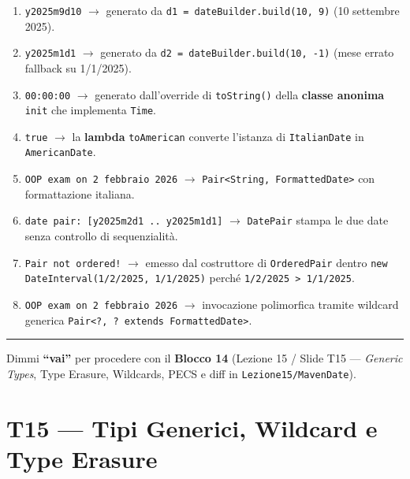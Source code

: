 \documentclass[11pt,a4paper,oneside]{report}
\newcommand{\passthrough}[1]{#1}
\providecommand{\tightlist}{\setlength{\itemsep}{0pt}\setlength{\parskip}{0pt}}
\begin{document}
\begin{enumerate}
\def\labelenumi{\arabic{enumi}.}
\tightlist
\item
  \passthrough{\lstinline!y2025m9d10!} \(\rightarrow\) generato da
  \passthrough{\lstinline!d1 = dateBuilder.build(10, 9)!} (10 settembre
  2025).
\item
  \passthrough{\lstinline!y2025m1d1!} \(\rightarrow\) generato da
  \passthrough{\lstinline!d2 = dateBuilder.build(10, -1)!} (mese errato
  fallback su 1/1/2025).
\item
  \passthrough{\lstinline!00:00:00!} \(\rightarrow\) generato
  dall'override di \passthrough{\lstinline!toString()!} della
  \textbf{classe anonima} \passthrough{\lstinline!init!} che implementa
  \passthrough{\lstinline!Time!}.
\item
  \passthrough{\lstinline!true!} \(\rightarrow\) la \textbf{lambda}
  \passthrough{\lstinline!toAmerican!} converte l'istanza di
  \passthrough{\lstinline!ItalianDate!} in
  \passthrough{\lstinline!AmericanDate!}.
\item
  \passthrough{\lstinline!OOP exam on 2 febbraio 2026!} \(\rightarrow\)
  \passthrough{\lstinline!Pair<String, FormattedDate>!} con
  formattazione italiana.
\item
  \passthrough{\lstinline!date pair: [y2025m2d1 .. y2025m1d1]!}
  \(\rightarrow\) \passthrough{\lstinline!DatePair!} stampa le due date
  senza controllo di sequenzialità.
\item
  \passthrough{\lstinline"Pair not ordered!"} \(\rightarrow\) emesso dal
  costruttore di \passthrough{\lstinline!OrderedPair!} dentro
  \passthrough{\lstinline!new DateInterval(1/2/2025, 1/1/2025)!} perché
  \passthrough{\lstinline!1/2/2025 > 1/1/2025!}.
\item
  \passthrough{\lstinline!OOP exam on 2 febbraio 2026!} \(\rightarrow\)
  invocazione polimorfica tramite wildcard generica
  \passthrough{\lstinline!Pair<?, ? extends FormattedDate>!}.
\end{enumerate}

\begin{center}\rule{0.5\linewidth}{0.5pt}\end{center}

Dimmi \textbf{``vai''} per procedere con il \textbf{Blocco 14} (Lezione
15 / Slide T15 --- \emph{Generic Types}, Type Erasure, Wildcards, PECS e
diff in \passthrough{\lstinline!Lezione15/MavenDate!}).

\newpage
\chapter[T15 --- Tipi Generici, Wildcard e Type Eras]{T15 --- Tipi Generici, Wildcard e Type Erasure}
\label{chap:t15}
\end{document}
